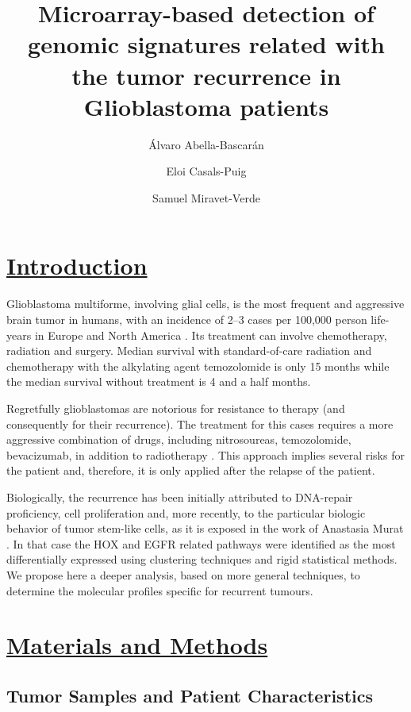 \documentclass[9pt,twocolumn,twoside]{gsajnl}
\title{Microarray-based detection of genomic signatures related with the tumor recurrence in Glioblastoma patients}
\author[$\ast$,1]{Álvaro Abella-Bascarán}
\author[$\ast$]{Eloi Casals-Puig}
\author[$\ast$]{Samuel Miravet-Verde}
\affil[$\ast$]{Pompeu Fabra University, Barcelona (Spain)}
\begin{document}
\maketitle
\thispagestyle{firststyle}
\marginmark
\firstpagefootnote
{}

\vspace{-1cm}
\section*{\underline{Introduction}}



Glioblastoma multiforme, involving glial cells, is the most frequent and aggressive brain tumor in humans, with an incidence of 2–3 cases per 100,000 person life-years in Europe and North America \citep{Bleeker2012}. Its treatment can involve chemotherapy, radiation and surgery. Median survival with standard-of-care radiation and chemotherapy with the alkylating agent temozolomide is only 15 months  \citep{Johnson2012} while the median survival without treatment is 4 and a half months. 

Regretfully glioblastomas are notorious for resistance to therapy (and consequently for their recurrence). The treatment for this cases requires a more aggressive combination of drugs, including nitrosoureas, temozolomide, bevacizumab, in addition to radiotherapy \citep{Weller2013}. This approach implies several risks for the patient and, therefore, it is only applied after the relapse of the patient.

Biologically, the recurrence has been initially attributed to DNA-repair proficiency, cell proliferation and, more recently, to the particular biologic behavior of tumor stem-like cells, as it is exposed in the work of Anastasia Murat \citep{Murat2008}. In that case the HOX and EGFR related pathways were identified as the most differentially expressed using clustering techniques and rigid statistical methods. We propose here a deeper analysis, based on more general techniques, to determine the molecular profiles specific for recurrent tumours.

\section*{\underline{Materials and Methods}}

\subsection*{Tumor Samples and Patient Characteristics}
\end{document}
